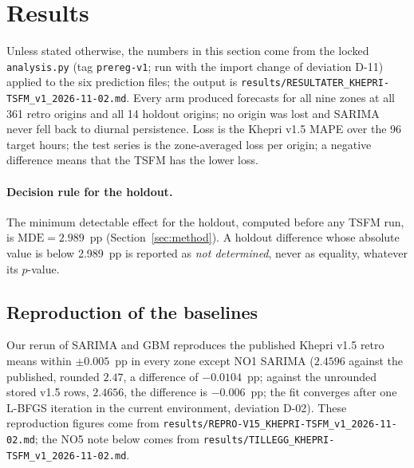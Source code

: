 \section{Results}
\label{sec:results}

Unless stated otherwise, the numbers in this section come from the locked \texttt{analysis.py} (tag
\texttt{prereg-v1}; run with the import change of deviation D-11) applied to the six prediction files; the output is
\texttt{results/RESULTATER\_KHEPRI-TSFM\_v1\_2026-11-02.md}. Every arm produced forecasts for all
nine zones at all 361 retro origins and all 14 holdout origins; no origin was lost and SARIMA
never fell back to diurnal persistence. Loss is the Khepri v1.5 MAPE over the 96 target hours;
the test series is the zone-averaged loss per origin; a negative difference means that the TSFM
has the lower loss.

\paragraph{Decision rule for the holdout.} The minimum detectable effect for the holdout,
computed before any TSFM run, is $\mathrm{MDE} = 2.989$~pp (Section~\ref{sec:method}). A holdout
difference whose absolute value is below 2.989~pp is reported as \emph{not determined}, never as
equality, whatever its $p$-value.

\subsection{Reproduction of the baselines}
Our rerun of SARIMA and GBM reproduces the published Khepri v1.5 retro means within
$\pm 0.005$~pp in every zone except NO1 SARIMA ($2.4596$ against the published, rounded $2.47$, a
difference of $-0.0104$~pp; against the unrounded stored v1.5 rows, $2.4656$, the difference is
$-0.006$~pp; the fit converges after one L-BFGS iteration in the current
environment, deviation D-02). These reproduction figures come from
\texttt{results/REPRO-V15\_KHEPRI-TSFM\_v1\_2026-11-02.md}; the NO5 note below comes from
\texttt{results/TILLEGG\_KHEPRI-TSFM\_v1\_2026-11-02.md}.

